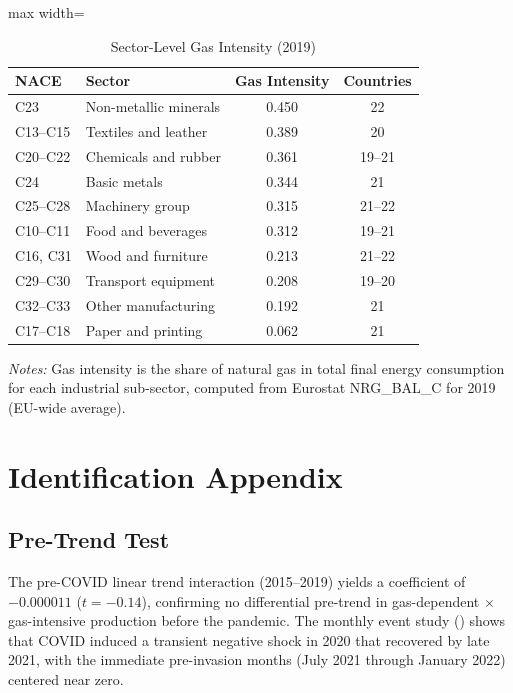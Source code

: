 \documentclass[12pt]{article}
\begin{document}
\begin{table}[H]
\centering
\caption{Sector-Level Gas Intensity (2019)}
\label{tab:sectors}
\begin{threeparttable}
\begin{adjustbox}{max width=\textwidth}
\begin{tabular}{llcc}
\toprule
NACE & Sector & Gas Intensity & Countries \\
\midrule
C23 & Non-metallic minerals & 0.450 & 22 \\
C13--C15 & Textiles and leather & 0.389 & 20 \\
C20--C22 & Chemicals and rubber & 0.361 & 19--21 \\
C24 & Basic metals & 0.344 & 21 \\
C25--C28 & Machinery group & 0.315 & 21--22 \\
C10--C11 & Food and beverages & 0.312 & 19--21 \\
C16, C31 & Wood and furniture & 0.213 & 21--22 \\
C29--C30 & Transport equipment & 0.208 & 19--20 \\
C32--C33 & Other manufacturing & 0.192 & 21 \\
C17--C18 & Paper and printing & 0.062 & 21 \\
\bottomrule
\end{tabular}
\end{adjustbox}
\begin{tablenotes}[flushleft]
\small
\item \textit{Notes:} Gas intensity is the share of natural gas in total final energy consumption for each industrial sub-sector, computed from Eurostat NRG\_BAL\_C for 2019 (EU-wide average).
\end{tablenotes}
\end{threeparttable}
\end{table}


\section{Identification Appendix}

\subsection{Pre-Trend Test}

The pre-COVID linear trend interaction (2015--2019) yields a coefficient of $-0.000011$ ($t = -0.14$), confirming no differential pre-trend in gas-dependent $\times$ gas-intensive production before the pandemic. The monthly event study () shows that COVID induced a transient negative shock in 2020 that recovered by late 2021, with the immediate pre-invasion months (July 2021 through January 2022) centered near zero.
\end{document}
